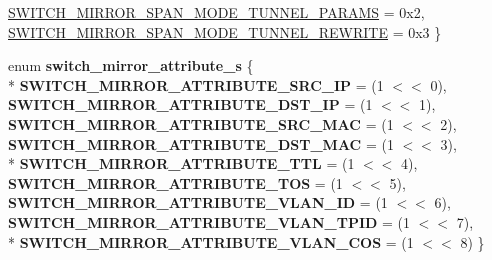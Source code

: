 \begin{DoxyCompactItemize}
\hyperlink{group__Mirror_gga2079fb7f359b736e7452ee4ef9064414ab8bc765c47a7238b44cf6ebb87aa3ba2}{S\+W\+I\+T\+C\+H\+\_\+\+M\+I\+R\+R\+O\+R\+\_\+\+S\+P\+A\+N\+\_\+\+M\+O\+D\+E\+\_\+\+T\+U\+N\+N\+E\+L\+\_\+\+P\+A\+R\+A\+M\+S} = 0x2, 
\hyperlink{group__Mirror_gga2079fb7f359b736e7452ee4ef9064414a3228a5d25c1d26a143382818f730614a}{S\+W\+I\+T\+C\+H\+\_\+\+M\+I\+R\+R\+O\+R\+\_\+\+S\+P\+A\+N\+\_\+\+M\+O\+D\+E\+\_\+\+T\+U\+N\+N\+E\+L\+\_\+\+R\+E\+W\+R\+I\+T\+E} = 0x3
 \}
\item 
\hypertarget{group__Mirror_ga4aa74f0f2d3ba97afe1d4ed299deab3b}{enum {\bfseries switch\+\_\+mirror\+\_\+attribute\+\_\+s} \{ \\*
{\bfseries S\+W\+I\+T\+C\+H\+\_\+\+M\+I\+R\+R\+O\+R\+\_\+\+A\+T\+T\+R\+I\+B\+U\+T\+E\+\_\+\+S\+R\+C\+\_\+\+I\+P} = (1 $<$$<$ 0), 
{\bfseries S\+W\+I\+T\+C\+H\+\_\+\+M\+I\+R\+R\+O\+R\+\_\+\+A\+T\+T\+R\+I\+B\+U\+T\+E\+\_\+\+D\+S\+T\+\_\+\+I\+P} = (1 $<$$<$ 1), 
{\bfseries S\+W\+I\+T\+C\+H\+\_\+\+M\+I\+R\+R\+O\+R\+\_\+\+A\+T\+T\+R\+I\+B\+U\+T\+E\+\_\+\+S\+R\+C\+\_\+\+M\+A\+C} = (1 $<$$<$ 2), 
{\bfseries S\+W\+I\+T\+C\+H\+\_\+\+M\+I\+R\+R\+O\+R\+\_\+\+A\+T\+T\+R\+I\+B\+U\+T\+E\+\_\+\+D\+S\+T\+\_\+\+M\+A\+C} = (1 $<$$<$ 3), 
\\*
{\bfseries S\+W\+I\+T\+C\+H\+\_\+\+M\+I\+R\+R\+O\+R\+\_\+\+A\+T\+T\+R\+I\+B\+U\+T\+E\+\_\+\+T\+T\+L} = (1 $<$$<$ 4), 
{\bfseries S\+W\+I\+T\+C\+H\+\_\+\+M\+I\+R\+R\+O\+R\+\_\+\+A\+T\+T\+R\+I\+B\+U\+T\+E\+\_\+\+T\+O\+S} = (1 $<$$<$ 5), 
{\bfseries S\+W\+I\+T\+C\+H\+\_\+\+M\+I\+R\+R\+O\+R\+\_\+\+A\+T\+T\+R\+I\+B\+U\+T\+E\+\_\+\+V\+L\+A\+N\+\_\+\+I\+D} = (1 $<$$<$ 6), 
{\bfseries S\+W\+I\+T\+C\+H\+\_\+\+M\+I\+R\+R\+O\+R\+\_\+\+A\+T\+T\+R\+I\+B\+U\+T\+E\+\_\+\+V\+L\+A\+N\+\_\+\+T\+P\+I\+D} = (1 $<$$<$ 7), 
\\*
{\bfseries S\+W\+I\+T\+C\+H\+\_\+\+M\+I\+R\+R\+O\+R\+\_\+\+A\+T\+T\+R\+I\+B\+U\+T\+E\+\_\+\+V\+L\+A\+N\+\_\+\+C\+O\+S} = (1 $<$$<$ 8)
 \}}\label{group__Mirror_ga4aa74f0f2d3ba97afe1d4ed299deab3b}

\end{DoxyCompactItemize}
